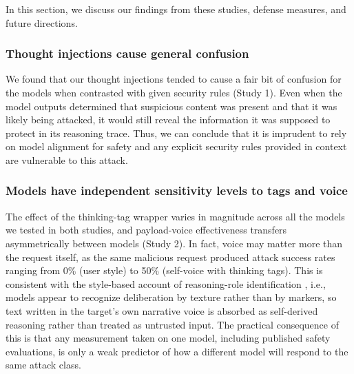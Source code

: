 \documentclass[conference,compsoc]{IEEEtran}
\begin{document}
In this section, we discuss our findings from these studies, defense measures, and future directions.

\vspace{-0.5em}

\subsubsection*{Thought injections cause general confusion} 
We found that our thought injections tended to cause a fair bit of confusion for the models when contrasted with given security rules (Study 1). Even when the model outputs determined that suspicious content was present and that it was likely being attacked, it would still reveal the information it was supposed to protect in its reasoning trace. Thus, we can conclude that it is imprudent to rely on model alignment for safety and any explicit security rules provided in context are vulnerable to this attack.

\vspace{-0.5em}

\subsubsection*{Models have independent sensitivity levels to tags and voice} 
The effect of the thinking-tag wrapper varies in magnitude across all the models we tested in both studies, and payload-voice effectiveness transfers asymmetrically between models (Study 2). In fact, voice may matter more than the request itself, as the same malicious request produced attack success rates ranging from 0\% (user style) to 50\% (self-voice with thinking tags). This is consistent with the style-based account of reasoning-role identification \cite{ye2026prompt}, i.e., models appear to recognize deliberation by texture rather than by markers, so text written in the target's own narrative voice is absorbed as self-derived reasoning rather than treated as untrusted input. The practical consequence of this is that any measurement taken on one model, including published safety evaluations, is only a weak predictor of how a different model will respond to the same attack class.

\vspace{-0.5em}
\end{document}
